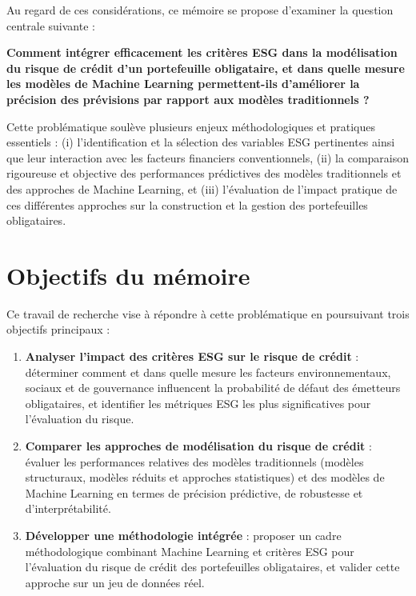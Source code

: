 Au regard de ces considérations, ce mémoire se propose d'examiner la question centrale suivante :

\textbf{Comment intégrer efficacement les critères ESG dans la modélisation du risque de crédit d'un portefeuille obligataire, et dans quelle mesure les modèles de Machine Learning permettent-ils d'améliorer la précision des prévisions par rapport aux modèles traditionnels ?}

Cette problématique soulève plusieurs enjeux méthodologiques et pratiques essentiels : (i) l'identification et la sélection des variables ESG pertinentes ainsi que leur interaction avec les facteurs financiers conventionnels, (ii) la comparaison rigoureuse et objective des performances prédictives des modèles traditionnels et des approches de Machine Learning, et (iii) l'évaluation de l'impact pratique de ces différentes approches sur la construction et la gestion des portefeuilles obligataires.

\section{Objectifs du mémoire}

Ce travail de recherche vise à répondre à cette problématique en poursuivant trois objectifs principaux :

\begin{enumerate}
    \item \textbf{Analyser l'impact des critères ESG sur le risque de crédit} : déterminer comment et dans quelle mesure les facteurs environnementaux, sociaux et de gouvernance influencent la probabilité de défaut des émetteurs obligataires, et identifier les métriques ESG les plus significatives pour l'évaluation du risque.

    \item \textbf{Comparer les approches de modélisation du risque de crédit} : évaluer les performances relatives des modèles traditionnels (modèles structuraux, modèles réduits et approches statistiques) et des modèles de Machine Learning en termes de précision prédictive, de robustesse et d'interprétabilité.

    \item \textbf{Développer une méthodologie intégrée} : proposer un cadre méthodologique combinant Machine Learning et critères ESG pour l'évaluation du risque de crédit des portefeuilles obligataires, et valider cette approche sur un jeu de données réel.
\end{enumerate}

